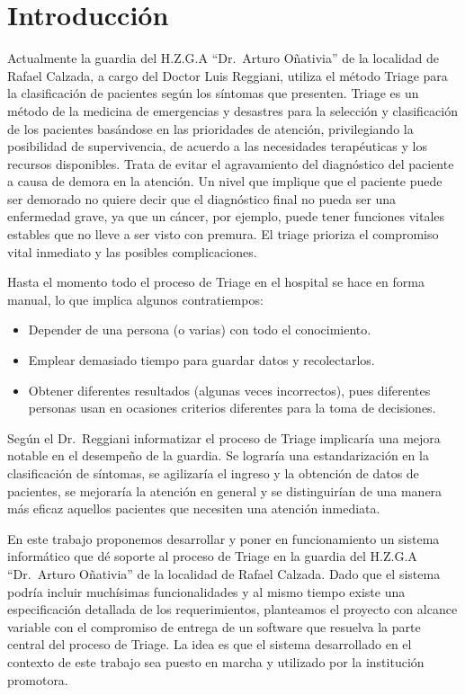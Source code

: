 \section{Introducción}

Actualmente la guardia del H.Z.G.A ``Dr.\ Arturo Oñativia'' de la localidad de Rafael Calzada, a cargo del Doctor Luis Reggiani, utiliza el método Triage \cite{Derlet,Manual} para la clasificación de pacientes según los síntomas que presenten. 
Triage es un método de la medicina de emergencias y desastres para la selección y clasificación de los pacientes basándose en las prioridades de atención, privilegiando la posibilidad de supervivencia, de acuerdo a las necesidades terapéuticas y los recursos disponibles. Trata de evitar el agravamiento del diagnóstico del paciente a causa de demora en la atención. Un nivel que implique que el paciente puede ser demorado no quiere decir que el diagnóstico final no pueda ser una enfermedad grave, ya que un cáncer, por ejemplo, puede tener funciones vitales estables que no lleve a ser visto con premura. El triage prioriza el compromiso vital inmediato y las posibles complicaciones.

Hasta el momento todo el proceso de Triage en el hospital se hace en forma manual, lo que implica algunos contratiempos:
\begin{itemize}
\item Depender de una persona (o varias) con todo el conocimiento.
\item Emplear demasiado tiempo para guardar datos y recolectarlos.
\item Obtener diferentes resultados (algunas veces incorrectos), pues diferentes personas usan en ocasiones criterios diferentes para la toma de decisiones.
\end{itemize}

Según el Dr.\ Reggiani informatizar el proceso de Triage implicaría una mejora notable en el desempeño de la guardia. Se lograría una estandarización en la clasificación de síntomas, se agilizaría el ingreso y la obtención de datos de pacientes, se mejoraría la atención en general y se distinguirían de una manera más eficaz aquellos pacientes que necesiten una atención inmediata.



En este trabajo proponemos desarrollar y poner en funcionamiento un sistema informático que dé soporte al proceso de Triage en la guardia del H.Z.G.A ``Dr.\ Arturo Oñativia'' de la localidad de Rafael Calzada. Dado que el sistema podría incluir muchísimas funcionalidades y al mismo tiempo existe una especificación detallada de los requerimientos, planteamos el proyecto con alcance variable con el compromiso de entrega de un software que resuelva la parte central del proceso de Triage. La idea es que el sistema desarrollado en el contexto de este trabajo sea puesto en marcha y utilizado por la institución promotora.

